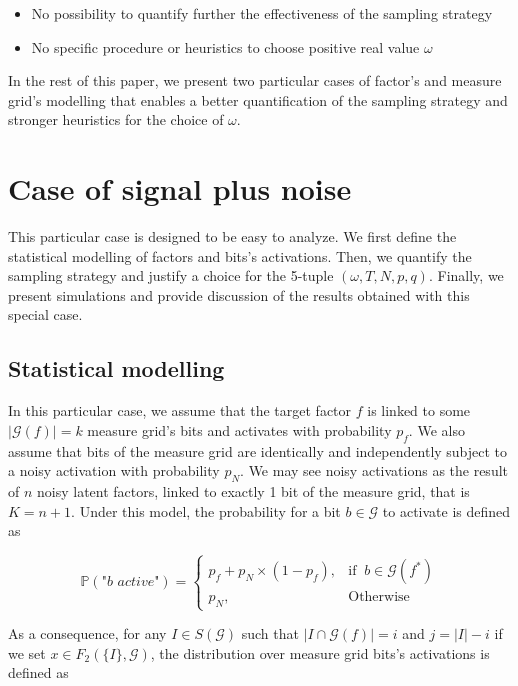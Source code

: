 \documentclass[a4paper, 11pt]{article}
\begin{document}
\begin{itemize}
\item No possibility to quantify further the effectiveness of the sampling strategy 
\item No specific procedure or heuristics to choose positive real value $\omega$
\end{itemize}

In the rest of this paper, we present two particular cases of factor's and measure grid's modelling that enables a better quantification of the sampling strategy and stronger heuristics for the choice of $\omega$. 

\section{Case of signal plus noise}

This particular case is designed to be easy to analyze. We first define the statistical modelling of factors and bits's activations. Then, we quantify the sampling strategy and justify a choice for the 5-tuple $(\omega, T, N, p, q)$. Finally, we present simulations and provide discussion of the results obtained with this special case.

\subsection{Statistical modelling}

In this particular case, we assume that the target factor $f$ is linked to some $\vert \mathcal{G}(f)\vert = k$ measure grid's bits and activates with probability $p_f$. We also assume that bits of the measure grid are identically and independently subject to a noisy activation with probability $p_N$. We may see noisy activations as the result of $n$ noisy latent factors, linked to exactly 1 bit of the measure grid, that is $K=n + 1$. Under this model, the probability for a bit $b\in \mathcal{G}$ to activate is defined as 

\begin{equation*}
\mathbb{P} \left( \textit{"b active"} \right) = \begin{cases} p_{f} + p_N \times (1-p_{f}), & \text{if }\ b \in \mathcal{G}(f^{*}) \\ p_N, & \text{Otherwise} \end{cases}
\end{equation*}

As a consequence, for any $I \in S(\mathcal{G})$ such that $\vert I \cap \mathcal{G}(f) \vert = i$ and $j = \vert I \vert -i$ if we set $x \in F_2 (\{I\} , \mathcal{G})$, the distribution over measure grid bits's activations is defined as
\end{document}
